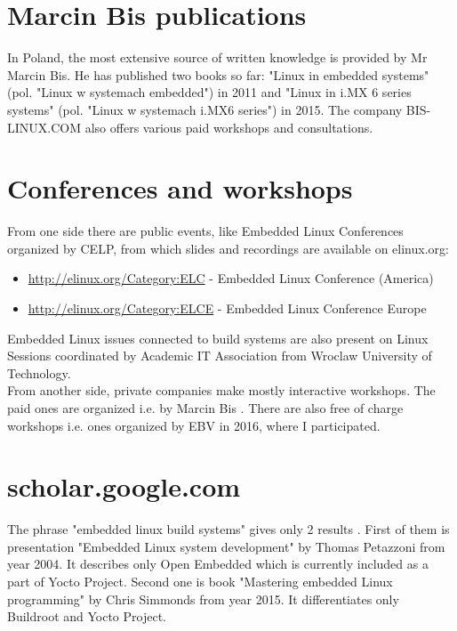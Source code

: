 \documentclass[printmode]{mgr}
\begin{document}
\section{Marcin Bis publications}

In Poland, the most extensive source of written knowledge is provided by Mr Marcin Bis.
He has published two books so far: "Linux in embedded systems" (pol. "Linux w systemach embedded") in 2011 and "Linux in i.MX 6 series systems" (pol. "Linux w systemach i.MX6 series") in 2015.
The company BIS-LINUX.COM also offers various paid workshops and consultations.

\section{Conferences and workshops}

From one side there are public events, like Embedded Linux Conferences organized by CELP, from which slides and recordings are available on elinux.org:

\begin{itemize}
  \item \url{http://elinux.org/Category:ELC} - Embedded Linux Conference (America)
  \item \url{http://elinux.org/Category:ELCE} - Embedded Linux Conference Europe
\end{itemize}

Embedded Linux issues connected to build systems are also present on Linux Sessions \cite{web:sesja-linuksowa} coordinated by Academic IT Association from Wroclaw University of Technology. \\

From another side, private companies make mostly interactive workshops. The paid ones are organized i.e. by Marcin Bis \cite{web:bis-szkolenia}. There are also free of charge workshops i.e. ones organized by EBV in 2016, where I participated.

\section{scholar.google.com}

The phrase "embedded linux build systems" gives only 2 results  \cite{web:scholar-1}. First of them is presentation "Embedded Linux system development" by Thomas Petazzoni from year 2004. It describes only Open Embedded which is currently included as a part of Yocto Project. Second one is book "Mastering embedded Linux programming" by Chris Simmonds from year 2015. It differentiates only Buildroot and Yocto Project. \\
\end{document}
